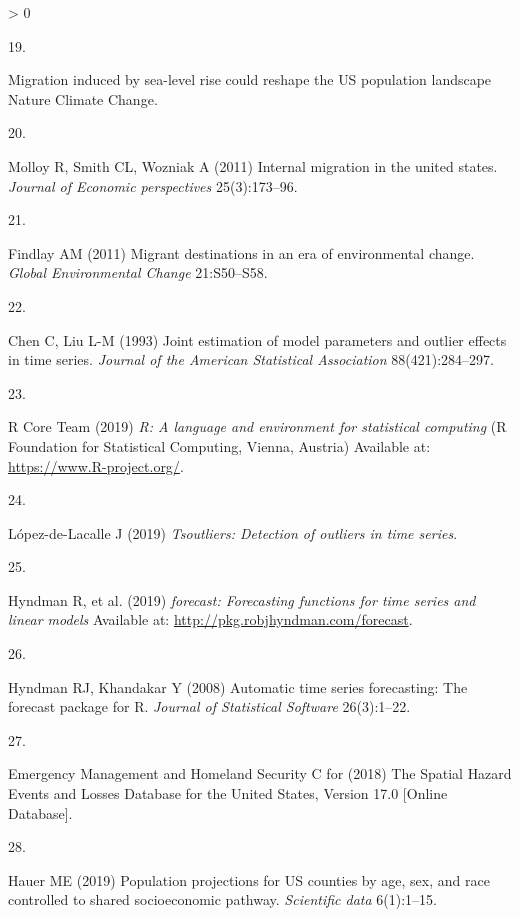 \documentclass[9pt,twocolumn,twoside,]{pnas-new}
\newlength{\csllabelwidth}
\newlength{\cslhangindent}
\newenvironment{CSLReferences}[3] %
 {%
  \setlength{\parindent}{0pt}
  \ifodd #1 \everypar{\setlength{\hangindent}{\cslhangindent}}\ignorespaces\fi
  \ifnum #2 > 0
  \setlength{\parskip}{#3\baselineskip}
  \fi
 }%
 {}
\newcommand{\CSLLeftMargin}[1]{\parbox[t]{\maxof{\widthof{#1}}{\csllabelwidth}}{#1}}
\newcommand{\CSLRightInline}[1]{\parbox[t]{\linewidth}{#1}}
\begin{document}
\begin{CSLReferences}{0}{0}
\leavevmode\hypertarget{ref-MigrationInducedSealevel}{}%
\CSLLeftMargin{19. }
\CSLRightInline{Migration induced by sea-level rise could reshape the
{US} population landscape \textbar{} {Nature Climate Change}.}

\leavevmode\hypertarget{ref-molloy2011internal}{}%
\CSLLeftMargin{20. }
\CSLRightInline{Molloy R, Smith CL, Wozniak A (2011) Internal migration
in the united states. \emph{Journal of Economic perspectives}
25(3):173--96.}

\leavevmode\hypertarget{ref-findlayMigrantDestinationsEra2011}{}%
\CSLLeftMargin{21. }
\CSLRightInline{Findlay AM (2011) Migrant destinations in an era of
environmental change. \emph{Global Environmental Change} 21:S50--S58.}

\leavevmode\hypertarget{ref-chen1993joint}{}%
\CSLLeftMargin{22. }
\CSLRightInline{Chen C, Liu L-M (1993) Joint estimation of model
parameters and outlier effects in time series. \emph{Journal of the
American Statistical Association} 88(421):284--297.}

\leavevmode\hypertarget{ref-rcore}{}%
\CSLLeftMargin{23. }
\CSLRightInline{R Core Team (2019) \emph{R: A language and environment
for statistical computing} (R Foundation for Statistical Computing,
Vienna, Austria) Available at: \url{https://www.R-project.org/}.}

\leavevmode\hypertarget{ref-tsoutliers2019}{}%
\CSLLeftMargin{24. }
\CSLRightInline{López-de-Lacalle J (2019) \emph{Tsoutliers: Detection of
outliers in time series}.}

\leavevmode\hypertarget{ref-Rforecast}{}%
\CSLLeftMargin{25. }
\CSLRightInline{Hyndman R, et al. (2019) \emph{{forecast}: Forecasting
functions for time series and linear models} Available at:
\url{http://pkg.robjhyndman.com/forecast}.}

\leavevmode\hypertarget{ref-hymdman2008}{}%
\CSLLeftMargin{26. }
\CSLRightInline{Hyndman RJ, Khandakar Y (2008) Automatic time series
forecasting: The forecast package for {R}. \emph{Journal of Statistical
Software} 26(3):1--22.}

\leavevmode\hypertarget{ref-SHELDUS}{}%
\CSLLeftMargin{27. }
\CSLRightInline{Emergency Management and Homeland Security C for (2018)
The {Spatial} {Hazard} {Events} and {Losses} {Database} for the {United}
{States}, {Version} 17.0 {[}{Online} {Database}{]}.}

\leavevmode\hypertarget{ref-hauer2019population}{}%
\CSLLeftMargin{28. }
\CSLRightInline{Hauer ME (2019) Population projections for US counties
by age, sex, and race controlled to shared socioeconomic pathway.
\emph{Scientific data} 6(1):1--15.}


\end{CSLReferences}
\end{document}
